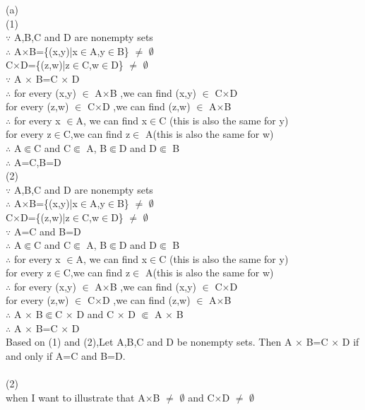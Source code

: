 \documentclass[11pt, a4paper, UTF8]{ctexart}
\begin{document}
\begin{solution}
(a)\\
(1)\\
$\because$ A,B,C and D are nonempty sets\\
$\therefore$ A$\times$B=\{(x,y)|x$\in$A,y$\in$B\} $\not=$ $\emptyset$ \\
\indent C$\times$D=\{(z,w)|z$\in$C,w$\in$D\} $\not=$ $\emptyset$ \\
$\because$ A $\times$ B=C $\times$ D\\
$\therefore$ for every (x,y) $\in$ A$\times$B ,we can find (x,y) $\in$ C$\times$D\\
\indent for every (z,w) $\in$ C$\times$D ,we can find (z,w) $\in$ A$\times$B\\
$\therefore$ for every x $\in$A, we can find x$\in$C (this is also the same for y)\\
\indent for every z$\in$C,we can find z$\in$ A(this is also the same for w)\\
$\therefore$ A$\Subset$C and C$\Subset$ A, B$\Subset$D and D$\Subset$ B\\
$\therefore$ A=C,B=D\\
(2)\\
$\because$ A,B,C and D are nonempty sets\\
$\therefore$ A$\times$B=\{(x,y)|x$\in$A,y$\in$B\} $\not=$ $\emptyset$ \\
\indent C$\times$D=\{(z,w)|z$\in$C,w$\in$D\} $\not=$ $\emptyset$ \\
$\because$ A=C and B=D\\
$\therefore$ A$\Subset$C and C$\Subset$ A, B$\Subset$D and D$\Subset$ B\\
$\therefore$ for every x $\in$A, we can find x$\in$C (this is also the same for y)\\
\indent for every z$\in$C,we can find z$\in$ A(this is also the same for w)\\
$\therefore$ for every (x,y) $\in$ A$\times$B ,we can find (x,y) $\in$ C$\times$D\\
\indent for every (z,w) $\in$ C$\times$D ,we can find (z,w) $\in$ A$\times$B\\
$\therefore$ A $\times$ B$\Subset$C $\times$ D and C $\times$ D $\Subset$  A $\times$ B\\
$\therefore$ A $\times$ B=C $\times$ D\\
Based on (1) and (2),Let A,B,C and D be nonempty sets. Then A $\times$ B=C $\times$ D if and only if A=C and B=D.\\
\\
(2)\\
when I want to illustrate that A$\times$B $\not=$ $\emptyset$ and C$\times$D $\not=$ $\emptyset$\\

\end{solution}
\end{document}
